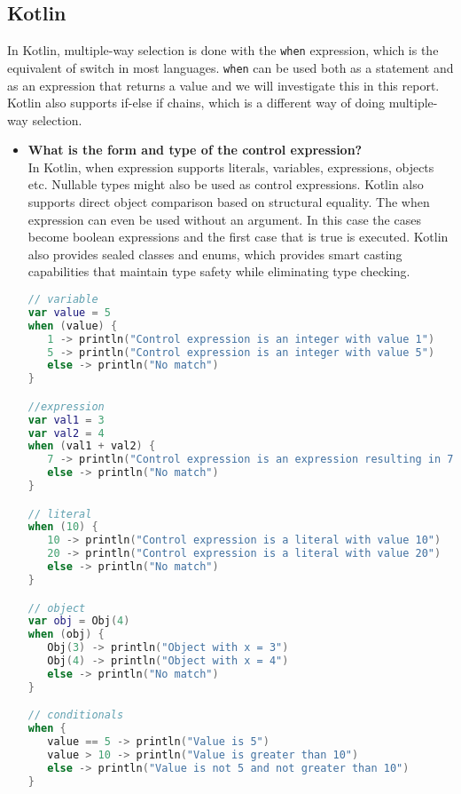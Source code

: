 \documentclass{article}
\begin{document}
\newpage





\subsection{Kotlin}
In Kotlin, multiple-way selection is done with the \texttt{when} expression, which is the equivalent of switch in most languages. \texttt{when} can be used both as a statement and as an expression that returns a value and we will investigate this in this report. Kotlin also supports if-else if chains, which is a different way of doing multiple-way selection.

\begin{itemize}
\item \textbf{What is the form and type of the control expression?} \\
In Kotlin, when expression supports literals, variables, expressions, objects etc. Nullable types might also be used as control expressions. Kotlin also supports direct object comparison based on structural equality. The when expression can even be used without an argument. In this case the cases become boolean expressions and the first case that is true is executed. Kotlin also provides sealed classes and enums, which provides smart casting capabilities that maintain type safety while eliminating type checking.

\begin{lstlisting}[language=Kotlin]
// variable
var value = 5
when (value) {
   1 -> println("Control expression is an integer with value 1")
   5 -> println("Control expression is an integer with value 5")
   else -> println("No match")
}

//expression
var val1 = 3
var val2 = 4
when (val1 + val2) {
   7 -> println("Control expression is an expression resulting in 7")
   else -> println("No match")
}

// literal
when (10) {
   10 -> println("Control expression is a literal with value 10")
   20 -> println("Control expression is a literal with value 20")
   else -> println("No match")
}

// object
var obj = Obj(4)
when (obj) {
   Obj(3) -> println("Object with x = 3")
   Obj(4) -> println("Object with x = 4")
   else -> println("No match")
}

// conditionals
when {
   value == 5 -> println("Value is 5")
   value > 10 -> println("Value is greater than 10")
   else -> println("Value is not 5 and not greater than 10")
}


\end{lstlisting}
\end{itemize}
\end{document}
